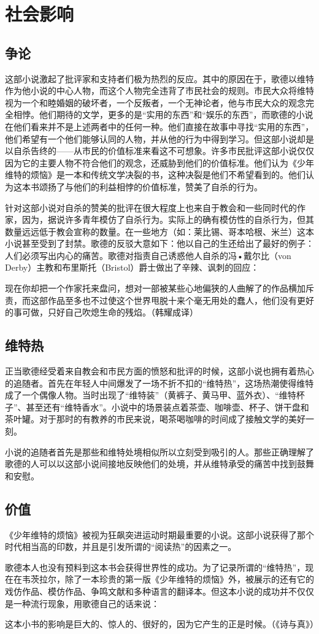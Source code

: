 \documentclass[12pt,oneside]{book}
\begin{document}
\chapter{社会影响}
\label{sec-6-3}
\section{争论}
\label{sec-6-3-1}
这部小说激起了批评家和支持者们极为热烈的反应。其中的原因在于，歌德以维特作为他小说的中心人物，而这个人物完全违背了市民社会的规则。市民大众将维特视为一个和睦婚姻的破坏者，一个反叛者，一个无神论者，他与市民大众的观念完全相悖。他们期待的文学，更多的是“实用的东西”和“娱乐的东西”，而歌德的小说在他们看来并不是上述两者中的任何一种。他们直接在故事中寻找“实用的东西”，他们希望有一个他们能够认同的人物，并从他的行为中得到学习。但这部小说却是以自杀告终的——从市民的价值标准来看这不可想象。许多市民批评这部小说仅仅因为它的主要人物不符合他们的观念，还威胁到他们的价值标准。他们认为《少年维特的烦恼》是一本和传统文学决裂的书，这种决裂是他们不希望看到的。他们认为这本书颂扬了与他们的利益相悖的价值标准，赞美了自杀的行为。

针对这部小说对自杀的赞美的批评在很大程度上也来自于教会和一些同时代的作家，因为，据说许多青年模仿了自杀行为。实际上的确有模仿性的自杀行为，但其数量远远低于教会宣称的数量。在一些地方（如：莱比锡、哥本哈根、米兰）这本小说甚至受到了封禁。歌德的反驳大意如下：他以自己的生还给出了最好的例子：人们必须写出内心的痛苦。歌德对指责自己诱惑他人自杀的冯•戴尔比（von Derby）主教和布里斯托（Bristol）爵士做出了辛辣、讽刺的回应：

现在你却把一个作家托来盘问，想对一部被某些心地偏狭的人曲解了的作品横加斥责，而这部作品至多也不过使这个世界甩脱十来个毫无用处的蠢人，他们没有更好的事可做，只好自己吹熄生命的残焰。（韩耀成译）


\section{维特热}
\label{sec-6-3-2}
正当歌德经受着来自教会和市民方面的愤怒和批评的时候，这部小说也拥有着热心的追随者。首先在年轻人中间爆发了一场不折不扣的“维特热”，这场热潮使得维特成了一个偶像人物。当时出现了“维特装”（黄裤子、黄马甲、蓝外衣）、“维特杯子”、甚至还有“维特香水”。小说中的场景装点着茶壶、咖啡壶、杯子、饼干盘和茶叶罐。对于那时的有教养的市民来说，喝茶喝咖啡的时间成了接触文学的美好一刻。

小说的追随者首先是那些和维特处境相似所以立刻受到吸引的人。那些正确理解了歌德的人可以以这部小说间接地反映他们的处境，并从维特承受的痛苦中找到鼓舞和安慰。



\section{价值}
\label{sec-6-3-3}
《少年维特的烦恼》被视为狂飙突进运动时期最重要的小说。这部小说获得了那个时代相当高的印数，并且是引发所谓的“阅读热”的因素之一。

歌德本人也没有预料到这本书会获得世界性的成功。为了记录所谓的“维特热”，现在在韦茨拉尔，除了一本珍贵的第一版《少年维特的烦恼》外，被展示的还有它的戏仿作品、模仿作品、争鸣文献和多种语言的翻译本。但这本小说的成功并不仅仅是一种流行现象，用歌德自己的话来说：

这本小书的影响是巨大的、惊人的、很好的，因为它产生的正是时候。（《诗与真》）
\end{document}
